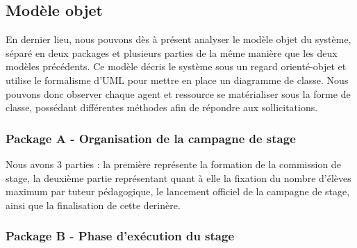 \documentclass[12pt,a4paper]{article}
\begin{document}
{
    \newpage {} 
    
    \restoregeometry {} \newpage
}

{
    \newpage {} 
    
    \restoregeometry {} \newpage
}

{
    \newpage {} 
    
    \restoregeometry {} \newpage
}

\subsection{Modèle objet}

En dernier lieu, nous pouvons dès à présent analyser le modèle objet du système,
séparé en deux packages et plusieurs parties de la même manière que les deux
modèles précédents. Ce modèle décris le système sous un regard orienté-objet
et utilise le formalisme d'UML pour mettre en place un diagramme de classe. Nous
pouvons donc observer chaque agent et ressource se matérialiser sous la forme de
classe, possédant différentes méthodes afin de répondre aux sollicitations.

\subsubsection{Package A - Organisation de la campagne de stage}

Nous avons 3 parties : la première représente la formation de la commission de
stage, la deuxième partie représentant quant à elle la fixation du nombre
d'élèves maximum par tuteur pédagogique, le lancement officiel de la campagne de
stage, ainsi que la finalisation de cette derinère.

{
    \tiny
    \newpage {} 
    
    \restoregeometry {} \newpage
}

{
    \newpage {} 
    
    \restoregeometry {} \newpage
}

\subsubsection{Package B - Phase d'exécution du stage}
\end{document}
